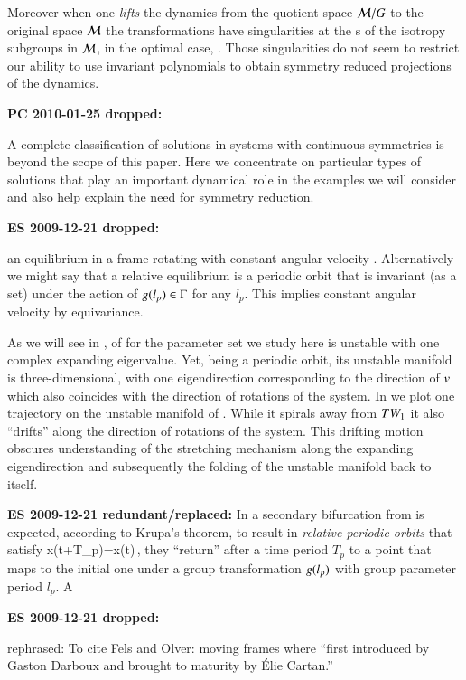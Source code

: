Moreover when
one \emph{lifts} the dynamics from the quotient space
$\mathcal{M}/G$ to the original space $\mathcal{M}$ the transformations
have singularities at the \fixedsp s of
the isotropy subgroups in $\mathcal{M}$, in the optimal case, \cf
{}. Those singularities do not seem to
restrict our ability to use invariant polynomials to obtain
symmetry reduced projections of the dynamics.

{\bf PC 2010-01-25 dropped:}

A complete classification of solutions in systems with
continuous symmetries is beyond the scope of this paper. Here
we concentrate on particular types of solutions that play an
important dynamical role in the examples we will consider and
also help explain the need for symmetry reduction.


{\bf ES 2009-12-21 dropped:}

 an equilibrium
in a frame rotating with constant angular velocity .
Alternatively we might say that a relative equilibrium is a
periodic orbit that is invariant (as a set) under the action
of $g(l_p)\in\Gamma$ for any $l_p$.
    This implies constant angular velocity by
    equivariance.

As we will see in ,  of {\cLe}
for the parameter set we study here is unstable with one
complex expanding eigenvalue. Yet, being a periodic orbit,
its unstable manifold is three-dimensional, with one
eigendirection corresponding to the direction of $v$ which
also coincides with the direction of rotations of the system.
In  we plot one trajectory on the unstable
manifold of . While it spirals away from
$TW_{1}$ it also ``drifts'' along the direction of
rotations of the system. This drifting motion obscures
understanding of the stretching mechanism along the expanding
eigendirection and subsequently the folding of the unstable
manifold back to itself.


{\bf ES 2009-12-21 redundant/replaced:}
In {\cLe} a secondary
bifurcation from  is expected, according to Krupa's
theorem, to result in \emph{relative periodic
orbits} that satisfy
\beq
	x(t+T_p)=x(t)\,,
\eeq
{\ie} they ``return'' after a time period $T_p$ to a point
that maps to the initial one under a group transformation
$g(l_p)$ with group parameter period $l_p$. A {\rpo}

{\bf ES 2009-12-21 dropped:}

rephrased: To cite Fels and Olver:
moving frames where ``first introduced by Gaston Darboux
and brought to maturity by \'Elie Cartan.''



